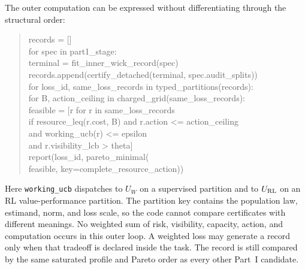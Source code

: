 \documentclass[11pt]{article}
\numberwithin{section}{part}
\theoremstyle{plain}
\theoremstyle{definition}
\theoremstyle{remark}
\begin{document}
The outer computation can be expressed without differentiating through the
structural order:
\begin{quote}
\small\ttfamily
records = []\\
for spec in part1\_stage:\\
\quad terminal = fit\_inner\_wick\_record(spec)\\
\quad records.append(certify\_detached(terminal, spec.audit\_splits))\\
for loss\_id, same\_loss\_records in typed\_partitions(records):\\
\quad for B, action\_ceiling in charged\_grid(same\_loss\_records):\\
\qquad feasible = [r for r in same\_loss\_records\\
\qquad\quad if resource\_leq(r.cost, B) and r.action <= action\_ceiling\\
\qquad\quad and working\_ucb(r) <= epsilon\\
\qquad\quad and r.visibility\_lcb > theta]\\
\qquad report(loss\_id, pareto\_minimal(\\
\qquad\qquad feasible, key=complete\_resource\_action))
\end{quote}
Here \texttt{working\_ucb} dispatches to \(U_W\) on a supervised partition
and to \(U_{\rm RL}\) on an RL value-performance partition.  The partition
key contains the population law, estimand, norm, and loss scale, so the code
cannot compare certificates with different meanings.
No weighted sum of risk, visibility, capacity, action, and computation occurs
in this outer loop.  A weighted loss may generate a record only when that
tradeoff is declared inside the task.  The record is still compared by the
same saturated profile and Pareto order as every other Part~I candidate.
\end{document}
